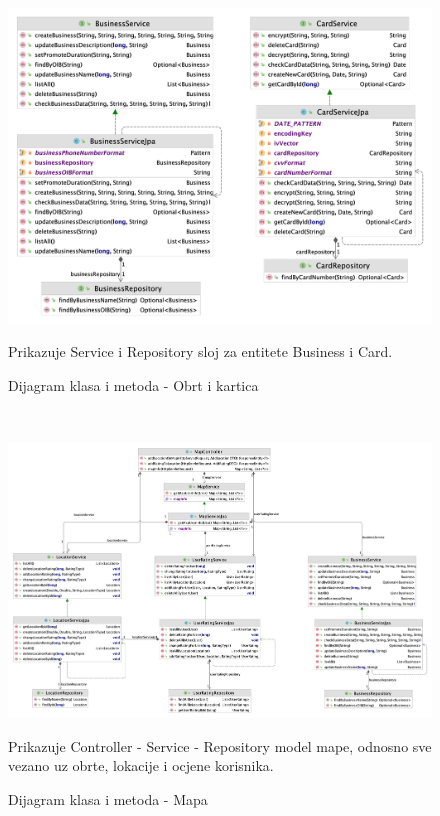             \begin{figure}[H]
                \includegraphics[width=\textwidth]{slike/DR-business-card.png} %
                \caption{Dijagram klasa i metoda - Obrt i kartica}
                \centerline{\small Prikazuje Service i Repository sloj za entitete Business i Card.}
                \label{fig:CSR_Other} %
		    \end{figure}
            \\
            
            \begin{figure}[H]
                \includegraphics[width=\textwidth]{slike/DR-map.png} %
                \caption{Dijagram klasa i metoda - Mapa}
                {\small Prikazuje Controller - Service - Repository model mape, odnosno sve vezano uz obrte, lokacije i ocjene korisnika.}
                \label{fig:CSR_Other} %
		    \end{figure}
            \\

